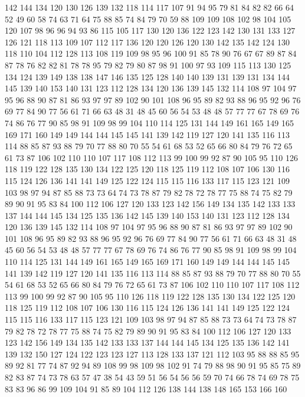 142 144 134 120 130 126 139 132 118 114 117 107 91 94 95 79 81 84 82 82
66 64 52 49 60 58 74 63 71 64 75 88 85 74 84 79 70 59 88 109
109 108 102 98 104 105 120 107 98 96 96 94 93 86 115 105 117 130 120 136
122 123 142 130 131 133 127 126 121 118 113 109 107 112 117 136 120 120 126 120
130 142 135 142 124 130 118 110 104 112 128 113 108 119 109 98 95 96 100 91
85 78 90 76 67 67 89 87 84 87 78 76 82 82 81 78 78 95 79 82
79 80 87 98 91 100 97 93 109 115 113 130 125 134 124 139 149 138 138 147
146 135 125 128 140 140 139 131 139 131 134 144 145 139 140 153 140 131 123 112
128 134 120 136 139 145 132 114 108 97 104 97 95 96 88 90 87 81 86 93
97 97 89 102 90 101 108 96 95 89 82 93 88 96 95 92 96 76 69 77
84 90 77 56 61 71 66 63 48 31 48 45 60 56 54 53 48 48 57 77
77 67 78 69 76 74 86 76 77 90 85 98 91 109 98 99 104 110 114 125
131 144 149 161 165 149 165 169 171 160 149 149 144 144 145 145 141 139 142 119
127 120 141 135 116 113 114 88 85 87 93 88 79 70 77 88 80 70 55 54
61 68 53 52 65 66 80 84 79 76 72 65 61 73 87 106 102 110 110 107
117 108 112 113 99 100 99 92 87 90 105 95 110 126 118 119 122 128 135 130
134 122 125 120 118 125 119 112 108 107 106 130 116 115 124 126 136 141 141 149
125 122 124 115 115 116 133 117 115 123 121 109 103 98 97 94 87 85 88 73
73 64 74 73 78 87 79 82 78 72 78 77 75 88 74 75 82 79 89 90
91 95 83 84 100 112 106 127 120 133 123 142 156 149 134 135 142 133 133 137
144 144 145 134 125 135 136 142 145 139 140 153 140 131 123 112 128 134 120 136
139 145 132 114 108 97 104 97 95 96 88 90 87 81 86 93 97 97 89 102
90 101 108 96 95 89 82 93 88 96 95 92 96 76 69 77 84 90 77 56
61 71 66 63 48 31 48 45 60 56 54 53 48 48 57 77 77 67 78 69
76 74 86 76 77 90 85 98 91 109 98 99 104 110 114 125 131 144 149 161
165 149 165 169 171 160 149 149 144 144 145 145 141 139 142 119 127 120 141 135
116 113 114 88 85 87 93 88 79 70 77 88 80 70 55 54 61 68 53 52
65 66 80 84 79 76 72 65 61 73 87 106 102 110 110 107 117 108 112 113
99 100 99 92 87 90 105 95 110 126 118 119 122 128 135 130 134 122 125 120
118 125 119 112 108 107 106 130 116 115 124 126 136 141 141 149 125 122 124 115
115 116 133 117 115 123 121 109 103 98 97 94 87 85 88 73 73 64 74 73
78 87 79 82 78 72 78 77 75 88 74 75 82 79 89 90 91 95 83 84
100 112 106 127 120 133 123 142 156 149 134 135 142 133 133 137 144 144 145 134
125 135 136 142 141 139 132 150 127 124 122 123 123 127 113 128 133 137 121 112
103 95 88 88 85 95 89 92 81 77 74 87 92 94 89 108 99 98 109 98
102 91 74 79 88 98 90 91 95 85 75 89 82 83 87 74 73 78 63 57
47 38 54 43 59 51 56 54 56 56 59 70 74 66 78 74 69 78 75 83
83 96 86 99 109 104 91 85 89 104 112 126 138 144 138 148 165 153 166 160
